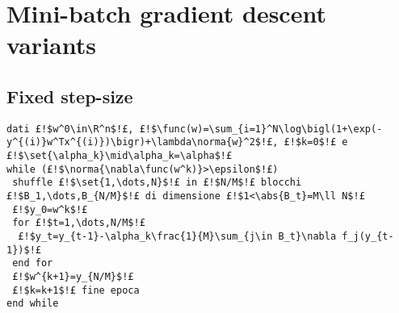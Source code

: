 \section{Mini-batch gradient descent variants}

\subsection{Fixed step-size}

\begin{lstlisting}[style=simple,title={Mini-batch Gradient Descent with fixed step-size}]
dati £!$w^0\in\R^n$!£, £!$\func(w)=\sum_{i=1}^N\log\bigl(1+\exp(-y^{(i)}w^Tx^{(i)})\bigr)+\lambda\norma{w}^2$!£, £!$k=0$!£ e £!$\set{\alpha_k}\mid\alpha_k=\alpha$!£
while (£!$\norma{\nabla\func(w^k)}>\epsilon$!£)
 shuffle £!$\set{1,\dots,N}$!£ in £!$N/M$!£ blocchi £!$B_1,\dots,B_{N/M}$!£ di dimensione £!$1<\abs{B_t}=M\ll N$!£
 £!$y_0=w^k$!£
 for £!$t=1,\dots,N/M$!£
  £!$y_t=y_{t-1}-\alpha_k\frac{1}{M}\sum_{j\in B_t}\nabla f_j(y_{t-1})$!£
 end for
 £!$w^{k+1}=y_{N/M}$!£
 £!$k=k+1$!£ fine epoca
end while
\end{lstlisting}




